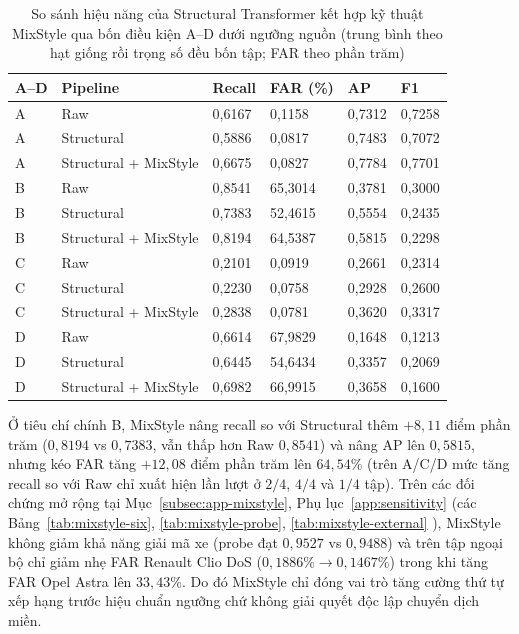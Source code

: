 \documentclass[12pt, a4paper, reqno, oneside]{book}
\begin{document}
{\renewcommand{\arraystretch}{0.85}
\begin{table}[htbp]\centering\footnotesize
\caption[Hiệu năng kết hợp MixStyle qua bốn điều kiện A--D dưới ngưỡng nguồn]{So sánh hiệu năng của Structural Transformer kết hợp kỹ thuật MixStyle qua bốn điều kiện A--D dưới ngưỡng nguồn (trung bình theo hạt giống rồi trọng số đều bốn tập; FAR theo phần trăm)}\label{tab:mixstyle-ad}
\begin{tabular}{P{1cm}P{4.3cm}P{1.6cm}P{2cm}P{1.5cm}P{1.5cm}}
\toprule
A--D & Pipeline & Recall & FAR (\%) & AP & F1\\\midrule
A & Raw & 0,6167 & 0,1158 & 0,7312 & 0,7258\\
A & Structural & 0,5886 & 0,0817 & 0,7483 & 0,7072\\
A & Structural + MixStyle & 0,6675 & 0,0827 & 0,7784 & 0,7701\\
B & Raw & 0,8541 & 65,3014 & 0,3781 & 0,3000\\
B & Structural & 0,7383 & 52,4615 & 0,5554 & 0,2435\\
B & Structural + MixStyle & 0,8194 & 64,5387 & 0,5815 & 0,2298\\
C & Raw & 0,2101 & 0,0919 & 0,2661 & 0,2314\\
C & Structural & 0,2230 & 0,0758 & 0,2928 & 0,2600\\
C & Structural + MixStyle & 0,2838 & 0,0781 & 0,3620 & 0,3317\\
D & Raw & 0,6614 & 67,9829 & 0,1648 & 0,1213\\
D & Structural & 0,6445 & 54,6434 & 0,3357 & 0,2069\\
D & Structural + MixStyle & 0,6982 & 66,9915 & 0,3658 & 0,1600\\
\bottomrule\end{tabular}
\end{table}}

Ở tiêu chí chính B, MixStyle nâng recall so với Structural thêm $+8{,}11$ điểm phần trăm ($0{,}8194$ vs $0{,}7383$, vẫn thấp hơn Raw $0{,}8541$) và nâng AP lên $0{,}5815$, nhưng kéo FAR tăng $+12{,}08$ điểm phần trăm lên $64{,}54\%$ (trên A/C/D mức tăng recall so với Raw chỉ xuất hiện lần lượt ở $2/4$, $4/4$ và $1/4$ tập). Trên các đối chứng mở rộng tại Mục~\ref{subsec:app-mixstyle}, Phụ lục~\ref{app:sensitivity} (các Bảng~\ref{tab:mixstyle-six}, \ref{tab:mixstyle-probe}, \ref{tab:mixstyle-external} ), MixStyle không giảm khả năng giải mã xe (probe đạt $0{,}9527$ vs $0{,}9488$) và trên tập ngoại bộ chỉ giảm nhẹ FAR Renault Clio DoS ($0{,}1886\% \to 0{,}1467\%$) trong khi tăng FAR Opel Astra lên $33{,}43\%$. Do đó MixStyle chỉ đóng vai trò tăng cường thứ tự xếp hạng trước hiệu chuẩn ngưỡng chứ không giải quyết độc lập chuyển dịch miền.
\end{document}
